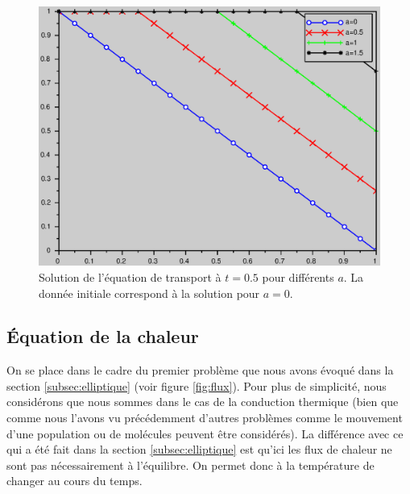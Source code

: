 \documentclass[12pt,a4paper,twoside]{article}
\begin{document}
\begin{figure}[h]
  \centering
  \includegraphics[width = 12cm]{Figures/transport_Dir_a.eps}
  \caption{Solution de l'\'equation de transport \`a $t=0.5$
  pour diff\'erents $a$. La donn\'ee initiale correspond \`a 
  la solution pour $a = 0$.}
  \label{fig:transport_a}
\end{figure}


\subsection{\'Equation de la chaleur}

On se place dans le cadre du premier probl\`eme que nous avons \'evoqu\'e dans
la section \ref{subsec:elliptique} (voir figure \ref{fig:flux}). 
Pour plus de simplicit\'e, nous consid\'erons que nous sommes dans le cas
de la conduction thermique (bien que comme nous l'avons vu pr\'ec\'edemment
d'autres probl\`emes comme le mouvement d'une population ou de mol\'ecules
peuvent \^etre consid\'er\'es).
La diff\'erence avec ce qui a \'et\'e fait dans la section \ref{subsec:elliptique}
est qu'ici les flux de chaleur ne sont pas n\'ecessairement \`a l'\'equilibre.
On permet donc \`a la temp\'erature de changer au cours du temps.
\end{document}
